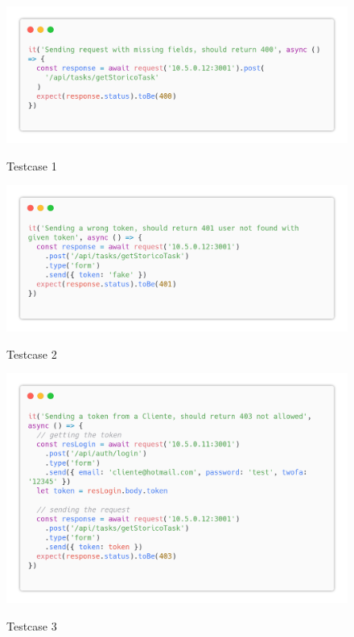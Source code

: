 \documentclass{report}
\begin{document}
\begin{figure}[H]
	\centering\includegraphics[width=1\textwidth]{images/code_storico_test1.png}
	
	Testcase 1
\end{figure}
\begin{figure}[H]
	\centering\includegraphics[width=1\textwidth]{images/code_storico_test2.png}
	
	Testcase 2
\end{figure}
\begin{figure}[H]
	\centering\includegraphics[width=1\textwidth]{images/code_storico_test3.png}
	
	Testcase 3
\end{figure}
\end{document}
